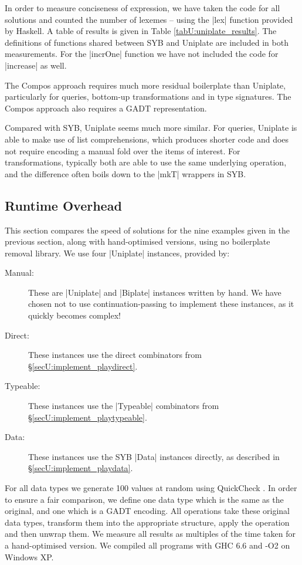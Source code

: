 In order to measure conciseness of expression, we have taken the code for all solutions and counted the number of lexemes -- using the |lex| function provided by Haskell. A table of results is given in Table \ref{tabU:uniplate_results}. The definitions of functions shared between SYB and Uniplate are included in both measurements. For the |incrOne| function we have not included the code for |increase| as well.

The Compos approach requires much more residual boilerplate than Uniplate, particularly for queries, bottom-up transformations and in type signatures. The Compos approach also requires a GADT representation.

Compared with SYB, Uniplate seems much more similar. For queries, Uniplate is able to make use of list comprehensions, which produces shorter code and does not require encoding a manual fold over the items of interest. For transformations, typically both are able to use the same underlying operation, and the difference often boils down to the |mkT| wrappers in SYB.


\subsection{Runtime Overhead}
\label{secU:results_speed}

This section compares the speed of solutions for the nine examples given in the previous section, along with hand-optimised versions, using no boilerplate removal library. We use four |Uniplate| instances, provided by:

\begin{description}
\item[Manual:] These are |Uniplate| and |Biplate| instances written by hand. We have chosen not to use continuation-passing to implement these instances, as it quickly becomes complex!
\item[Direct:] These instances use the direct combinators from \S\ref{secU:implement_playdirect}.
\item[Typeable:] These instances use the |Typeable| combinators from \S\ref{secU:implement_playtypeable}.
\item[Data:] These instances use the SYB |Data| instances directly, as described in \S\ref{secU:implement_playdata}.
\end{description}

For all data types we generate 100 values at random using QuickCheck \citep{quickcheck}. In order to ensure a fair comparison, we define one data type which is the same as the original, and one which is a GADT encoding. All operations take these original data types, transform them into the appropriate structure, apply the operation and then unwrap them. We measure all results as multiples of the time taken for a hand-optimised version. We compiled all programs with GHC 6.6 and -O2 on Windows XP.

